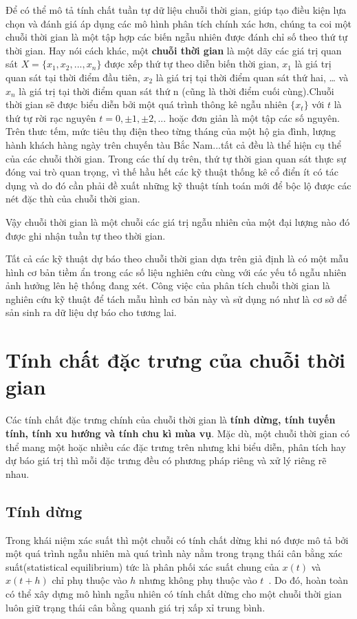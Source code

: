 \documentclass[twoside,12pt]{Latex/Classes/PhDthesisPSnPDF}
\begin{document}
Để có thể mô tả tính chất tuần tự dữ liệu chuỗi thời gian, giúp tạo điều kiện lựa chọn và đánh giá áp dụng các mô hình phân tích chính xác hơn, chúng ta coi một chuỗi thời gian là một tập hợp các biến ngẫu nhiên được đánh chỉ số theo thứ tự thời gian. Hay nói cách khác, một \textbf{chuỗi thời gian}\cite{ross} là một dãy các giá trị quan sát $X =\{x_1,x_2,...,x_n\}$ được xếp thứ tự theo diễn biến thời gian, $x_1$ là giá trị quan sát tại thời điểm đầu tiên, $x_2$ là giá trị tại thời điểm quan sát thứ hai, … và $x_n$  là giá trị tại thời điểm quan sát thứ n (cũng là thời điểm cuối cùng).Chuỗi thời gian sẽ được biểu diễn bởi một quá trình thông kê ngẫu nhiên $\{x_t\}$ với $t$ là thứ tự rời rạc nguyên $t = 0, \pm1,\pm2,...$ hoặc đơn giản là một tập các số nguyên. Trên thưc tếm, mức tiêu thụ điện theo từng tháng của một hộ gia đình, lượng hành khách hàng ngày trên chuyến tàu Bắc Nam...tất cả đều là thể hiện cụ thể của các chuỗi thời gian. Trong các thí dụ trên, thứ tự thời gian quan sát thực sự đóng vai trò quan trọng, vì thế hầu hết các kỹ thuật thống kê cổ điển ít có tác dụng và do đó cần phải đề xuất những kỹ thuật tính toán mới để bộc lộ được các nét đặc thù của chuỗi thời gian. 

Vậy chuỗi thời gian là một chuỗi các giá trị ngẫu nhiên của một đại lượng nào đó được ghi nhận tuần tự theo thời gian.

Tất cả các kỹ thuật dự báo theo chuỗi thời gian dựa trên giả định là có một mẫu hình cơ bản tiềm ẩn trong các số liệu nghiên cứu cùng với các yếu tố ngẫu nhiên ảnh hưởng lên hệ thống đang xét. Công việc của phân tích chuỗi thời gian là nghiên cứu kỹ thuật để tách mẫu hình cơ bản này và sử dụng nó như là cơ sở để sản sinh ra dữ liệu dự báo cho tương lai.

\section{Tính chất đặc trưng của chuỗi thời gian}
Các tính chất đặc trưng chính \citep{cits} của chuỗi thời gian là \textbf{tính dừng, tính tuyến tính, tính xu hướng và tính chu kì mùa vụ}. Mặc dù, một chuỗi thời gian có thể mang một hoặc nhiều các đặc trưng trên nhưng khi biểu diễn, phân tích hay dự báo giá trị thì mỗi đặc trưng đều có phương pháp riêng và xử lý riêng rẽ nhau. 

\subsection{Tính dừng}
Trong khái niệm xác suất thì một chuỗi có tính chất dừng khi nó được mô tả bởi một quá trình ngẫu nhiên mà quá trình này nằm trong trạng thái cân bằng xác suất(statistical equilibrium) tức là phân phối xác suất chung của $x(t)$ và $x(t+h)$ chỉ phụ thuộc vào $h$ nhưng không phụ thuộc vào $t$~\cite{cits}. Do đó, hoàn toàn có thể xây dựng mô hình ngẫu nhiên có tính chất dừng cho một chuỗi thời gian luôn giữ trạng thái cân bằng quanh giá trị xấp xỉ trung bình.
\end{document}
